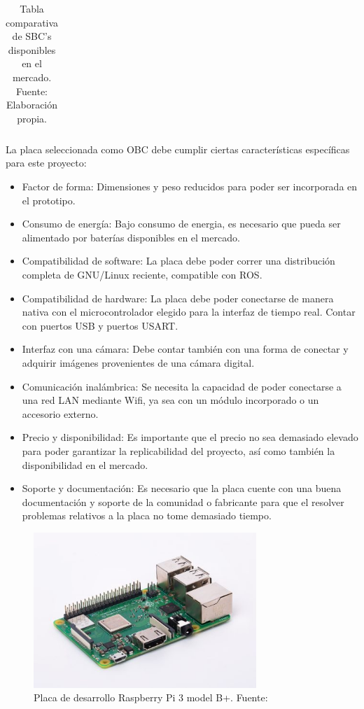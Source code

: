 \begin{table}[]
{\begin{tabular}{@{}|c|c|c|c|c|c|c|c|@{}}
        \end{tabular}%
        }
        \caption{Tabla comparativa de SBC's disponibles en el mercado. Fuente: Elaboración propia.}
        \label{tbl:sbc}
        \end{table}


    La placa seleccionada como OBC debe cumplir ciertas características específicas para este proyecto:


    \begin{itemize}
        \item Factor de forma: Dimensiones y peso reducidos para poder ser incorporada en el prototipo.
        \item Consumo de energía: Bajo consumo de energia, es necesario que pueda ser alimentado por baterías disponibles en el mercado.
        \item Compatibilidad de software: La placa debe poder correr una distribución completa de GNU/Linux reciente, compatible con ROS.
        \item Compatibilidad de hardware: La placa debe poder conectarse de manera nativa con el microcontrolador elegido para la interfaz de tiempo real. Contar con puertos USB y puertos USART.
        \item Interfaz con una cámara: Debe contar también con una forma de conectar y adquirir imágenes provenientes de una cámara digital.
        \item Comunicación inalámbrica: Se necesita la capacidad de poder conectarse a una red LAN mediante Wifi, ya sea con un módulo incorporado o un accesorio externo.
        \item Precio y disponibilidad: Es importante que el precio no sea demasiado elevado para poder garantizar la replicabilidad del proyecto, así como también la disponibilidad en el mercado.
        \item Soporte y documentación: Es necesario que la placa cuente con una buena documentación y soporte de la comunidad o fabricante para que el resolver problemas relativos a la placa no tome demasiado tiempo.
    \end{itemize}

    \begin{figure}[!h] 
        \centering
        \includegraphics[width=0.75\textwidth]{img/raspi}
        \caption[Placa de desarrollo Raspberry Pi 3 model B+]{Placa de desarrollo Raspberry Pi 3 model B+. Fuente: \cite{raspi} }
        \label{fig:raspi}
    \end{figure}

